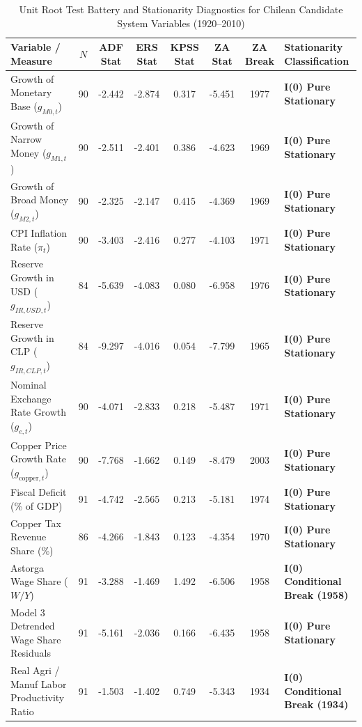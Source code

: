 \begin{landscape}
\begin{table}[p]
\centering
\footnotesize
\caption{Unit Root Test Battery and Stationarity Diagnostics for Chilean Candidate System Variables (1920--2010)}
\label{tab:urca_results_full}
\begin{tabular}{l c c c c c c l}
\toprule
\textbf{Variable / Measure} & \textbf{$N$} & \textbf{ADF Stat} & \textbf{ERS Stat} & \textbf{KPSS Stat} & \textbf{ZA Stat} & \textbf{ZA Break} & \textbf{Stationarity Classification} \\
\midrule
Growth of Monetary Base ($g_{M0,t}$) & 90 & -2.442 & -2.874 & 0.317 & -5.451 & 1977 & \textbf{I(0) Pure Stationary} \\
Growth of Narrow Money ($g_{M1,t}$) & 90 & -2.511 & -2.401 & 0.386 & -4.623 & 1969 & \textbf{I(0) Pure Stationary} \\
Growth of Broad Money ($g_{M2,t}$) & 90 & -2.325 & -2.147 & 0.415 & -4.369 & 1969 & \textbf{I(0) Pure Stationary} \\
CPI Inflation Rate ($\pi_{t}$) & 90 & -3.403 & -2.416 & 0.277 & -4.103 & 1971 & \textbf{I(0) Pure Stationary} \\
Reserve Growth in USD ($g_{IR,USD,t}$) & 84 & -5.639 & -4.083 & 0.080 & -6.958 & 1976 & \textbf{I(0) Pure Stationary} \\
Reserve Growth in CLP ($g_{IR,CLP,t}$) & 84 & -9.297 & -4.016 & 0.054 & -7.799 & 1965 & \textbf{I(0) Pure Stationary} \\
Nominal Exchange Rate Growth ($g_{e,t}$) & 90 & -4.071 & -2.833 & 0.218 & -5.487 & 1971 & \textbf{I(0) Pure Stationary} \\
Copper Price Growth Rate ($g_{\text{copper},t}$) & 90 & -7.768 & -1.662 & 0.149 & -8.479 & 2003 & \textbf{I(0) Pure Stationary} \\
Fiscal Deficit (\% of GDP) & 91 & -4.742 & -2.565 & 0.213 & -5.181 & 1974 & \textbf{I(0) Pure Stationary} \\
Copper Tax Revenue Share (\%) & 86 & -4.266 & -1.843 & 0.123 & -4.354 & 1970 & \textbf{I(0) Pure Stationary} \\
Astorga Wage Share ($W/Y$) & 91 & -3.288 & -1.469 & 1.492 & -6.506 & 1958 & \textbf{I(0) Conditional Break (1958)} \\
Model 3 Detrended Wage Share Residuals & 91 & -5.161 & -2.036 & 0.166 & -6.435 & 1958 & \textbf{I(0) Pure Stationary} \\
Real Agri / Manuf Labor Productivity Ratio & 91 & -1.503 & -1.402 & 0.749 & -5.343 & 1934 & \textbf{I(0) Conditional Break (1934)} \\

\end{tabular}
\end{table}
\end{landscape}
